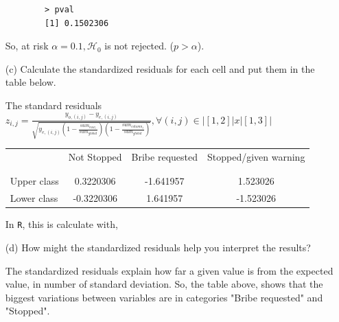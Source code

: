 \documentclass[12pt,letterpaper]{article}
\begin{document}
\begin{enumerate}
	\begin{verbatim}
		> pval
		[1] 0.1502306
	\end{verbatim}

	So, at risk $\alpha=0.1, \mathcal{H}_0$ is not rejected. ($p>\alpha$).

	\newpage
	\item [(c)] Calculate the standardized residuals for each cell and put them in the table below.
	\vspace{1cm}

	The standard residuals $z_{i,j}=\frac{y_{o, (i,j)}-y_{e, (i,j)}}{\sqrt{ y_{e, (i,j)} (1- \frac{ sum_{raw_i}}{sum_{global}})(1- \frac{ sum_{column_j}}{sum_{global}}{})  }} , \forall (i,j) \in |[1,2]|x|[1,3]|$

	\begin{table}[h]
		\centering
		\begin{tabular}{l | c c c }
			& Not Stopped & Bribe requested & Stopped/given warning \\
			\\[-1.8ex] 
			\hline \\[-1.8ex]
			Upper class  & 0.3220306 &-1.641957 &  1.523026 \\
			Lower class & -0.3220306&  1.641957 &-1.523026 \\
			
		\end{tabular}
	\end{table}
	
	In  \texttt{R}, this is calculate with, 
	  
		

	\item [(d)] How might the standardized residuals help you interpret the results?  

	The standardized residuals explain how far a given value is from the expected value, in number of standard deviation. So, the table above, shows that the biggest variations between variables are in categories "Bribe requested" and "Stopped".

\end{enumerate}
\end{document}
